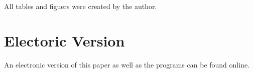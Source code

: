 \documentclass[10pt]{scrreprt}
\begin{document}

\listoftables

All tables and figuers were created by the author. %

\printbibliography

\chapter*{Electoric Version}
An electronic version of this paper as well as the programs can be found online. %


 
\end{document}
